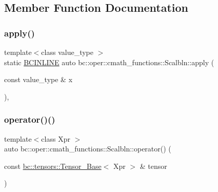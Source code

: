 \subsection{Member Function Documentation}
\mbox{\label{structbc_1_1oper_1_1cmath__functions_1_1Scalbln_af15898d12c1129b5eb2617327465e4bd}} 
\subsubsection{\texorpdfstring{apply()}{apply()}}
{\footnotesize\ttfamily template$<$class value\+\_\+type $>$ \\
static \hyperlink{common_8h_a6699e8b0449da5c0fafb878e59c1d4b1}{B\+C\+I\+N\+L\+I\+NE} auto bc\+::oper\+::cmath\+\_\+functions\+::\+Scalbln\+::apply (\begin{DoxyParamCaption}\item[{const value\+\_\+type \&}]{x }\end{DoxyParamCaption})\hspace{0.3cm}{\ttfamily [inline]}, {\ttfamily [static]}}

\mbox{\label{structbc_1_1oper_1_1cmath__functions_1_1Scalbln_ab3fdf7e572fa60f2a37a525838587866}} 
\subsubsection{\texorpdfstring{operator()()}{operator()()}\hspace{0.1cm}{\footnotesize\ttfamily [1/3]}}
{\footnotesize\ttfamily template$<$class Xpr $>$ \\
auto bc\+::oper\+::cmath\+\_\+functions\+::\+Scalbln\+::operator() (\begin{DoxyParamCaption}\item[{const \hyperlink{classbc_1_1tensors_1_1Tensor__Base}{bc\+::tensors\+::\+Tensor\+\_\+\+Base}$<$ Xpr $>$ \&}]{tensor }\end{DoxyParamCaption})\hspace{0.3cm}{\ttfamily [inline]}}

